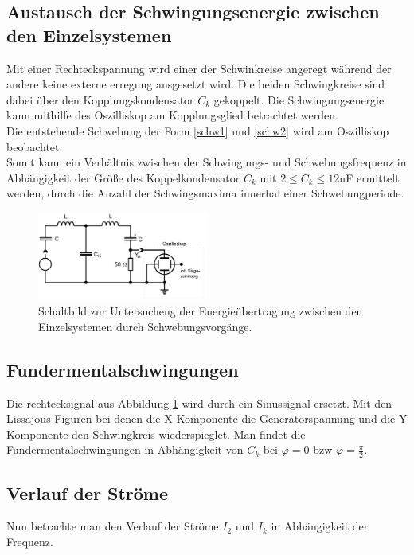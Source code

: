 \subsection{Austausch der Schwingungsenergie zwischen den Einzelsystemen}
Mit einer Rechteckspannung wird einer der Schwinkreise angeregt während der andere
keine externe erregung ausgesetzt wird. Die beiden Schwingkreise sind dabei über den
Kopplungskondensator $C_k$ gekoppelt. Die Schwingungsenergie kann mithilfe des
Oszilliskop am Kopplungsglied betrachtet werden.\\
Die entstehende Schwebung der Form \ref{schw1} und \ref{schw2}
wird am Oszilliskop beobachtet.\\
Somit kann ein Verhältnis zwischen der Schwingungs- und Schwebungsfrequenz in 
Abhängigkeit der Größe des Koppelkondensator $C_k$ mit $2\leq C_k \leq 12$nF ermittelt 
werden, durch die Anzahl der Schwingsmaxima innerhal einer Schwebungperiode.
\begin{figure}
    \centering
    \includegraphics[width=0.5\textwidth]{bilder/a.jpg}
    \caption{
        Schaltbild zur Untersucheng der Energieübertragung zwischen den Einzelsystemen
        durch Schwebungsvorgänge. \cite[306]{Anleitung}
    }
    \label{fig:Versuchsaufbau}
\end{figure}
\subsection{Fundermentalschwingungen}
Die rechtecksignal aus Abbildung \ref{fig:Versuchsaufbau} wird durch ein Sinussignal
ersetzt. Mit den Lissajous-Figuren bei denen die X-Komponente die Generatorspannung 
und die Y Komponente den Schwingkreis wiederspieglet.
Man findet die Fundermentalschwingungen in Abhängigkeit von $C_k$ bei $\varphi=0$ bzw $\varphi=\frac{\pi}{2}$.\\

\subsection{Verlauf der Ströme}
Nun betrachte man den Verlauf der Ströme $I_2$ und $I_k$ in Abhängigkeit der Frequenz.






\label{sec:Durchfuehrung}

